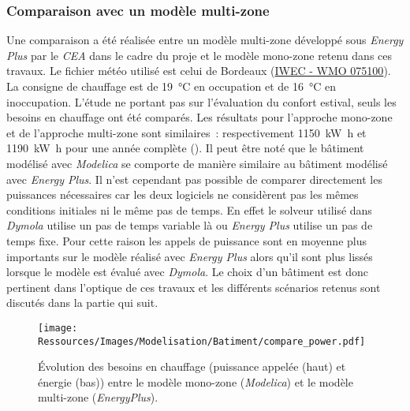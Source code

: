 \subsubsection{Comparaison avec un modèle multi-zone} %
\label{ssub:comparaison_avec_un_modele_multi_zone}
Une comparaison a été réalisée entre un modèle multi-zone développé sous \textit{Energy Plus}
par le \textit{CEA} dans le cadre du proje  et le modèle mono-zone
retenu dans ces travaux. Le fichier météo utilisé est celui de Bordeaux
(\href{https://www.energyplus.net/weather-download/europe_wmo_region_6/FRA//FRA_Bordeaux.075100_IWEC/all}{IWEC - WMO 075100}).
La consigne de chauffage est de \SI{19}{\celsius} en occupation et de \SI{16}{\celsius} en
inoccupation. L’étude ne portant pas sur l’évaluation du confort estival, seuls les
besoins en chauffage ont été comparés. Les résultats pour l’approche mono-zone et de l’approche
multi-zone sont similaires~: respectivement \SI{1150}{\kilo\watt\hour} et
\SI{1190}{\kilo\watt\hour} pour une année complète ().
Il peut être noté que le bâtiment modélisé avec \textit{Modelica} se comporte de
manière similaire au bâtiment modélisé avec \textit{Energy Plus}. Il n’est cependant
pas possible de comparer directement les puissances nécessaires car les deux logiciels
ne considèrent pas les mêmes conditions initiales ni le même pas de temps. En effet le solveur
utilisé dans \textit{Dymola} utilise un pas de temps variable là ou \textit{Energy Plus}
utilise un pas de temps fixe. Pour cette raison les appels de puissance sont en moyenne
plus importants sur le modèle réalisé avec \textit{Energy Plus} alors qu’il sont plus
lissés lorsque le modèle est évalué avec \textit{Dymola}. Le choix d’un bâtiment est
donc pertinent dans l’optique de ces travaux et les différents scénarios retenus
sont discutés dans la partie qui suit.

\begin{figure}
    \centering
    \texttt{[image: Ressources/Images/Modelisation/Batiment/compare\_power.pdf]}
    \caption[Évolution des besoins de chauffage entre le modèle mono-zone et multi-zone]
             {Évolution des besoins en chauffage (puissance appelée (haut) et énergie (bas)) entre le modèle mono-zone
              (\textit{Modelica}) et le modèle multi-zone (\textit{EnergyPlus}).}
    \label{fig:compare_models}
\end{figure}


